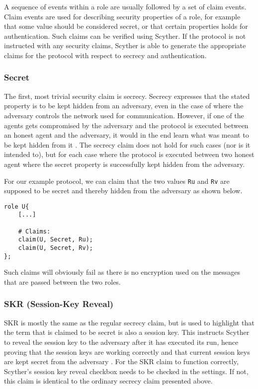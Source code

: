 A sequence of events within a role are usually followed by a set of claim events. Claim events are used for describing security properties of a role, for example that some value should be considered secret, or that certain properties holds for authentication. Such claims can be verified using Scyther. If the protocol is not instructed with any security claims, Scyther is able to generate the appropriate claims  for the protocol with respect to secrecy and authentication.

\subsubsection{Secret}

The first, most trivial security claim is secrecy. Secrecy expresses that the stated property is to be kept hidden from an adversary, even in the case of where the adversary controls the network used for communication. However, if one of the agents gets compromised by the adversary and the protocol is executed between an honest agent and the adversary, it would in the end learn what was meant to be kept hidden from it \cite{cremers2005operational}. The secrecy claim does not hold for such cases (nor is it intended to), but for each case where the protocol is executed between two honest agent where the secret property is successfully kept hidden from the adversary.

For our example protocol, we can claim that the two values \texttt{Ru} and \texttt{Rv} are supposed to be secret and thereby hidden from the adversary as shown below.\newline

\begin{lstlisting}
role U{
	[...]
	
	# Claims:
	claim(U, Secret, Ru);
	claim(U, Secret, Rv);
};
\end{lstlisting}

Such claims will obviously fail as there is no encryption used on the messages that are passed between the two roles. 


\subsubsection{SKR (Session-Key Reveal)}

SKR is mostly the same as the regular secrecy claim, but is used to highlight that the term that is claimed to be secret is also a session key. This instructs Scyther to reveal the session key to the adversary after it has executed its run, hence proving that the session keys are working correctly and that current session keys are kept secret from the adversary \cite{scyther-manual}. For the SKR claim to function correctly, Scyther's session key reveal checkbox needs to be checked in the settings. If not, this claim is identical to the ordinary secrecy claim presented above.


